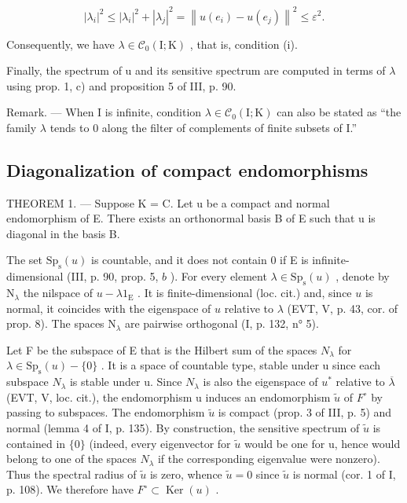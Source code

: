 \[
\left| \lambda_ {i} \right| ^ {2} \leqslant \left| \lambda_ {i} \right| ^ {2} + \left| \lambda_ {j} \right| ^ {2} = \left\| u \left(e _ {i}\right) - u \left(e _ {j}\right) \right\| ^ {2} \leqslant \varepsilon^ {2}.
\]

Consequently, we have \(\lambda \in \mathcal{C}_0(\mathrm{I};\mathrm{K})\) , that is, condition (i).

Finally, the spectrum of u and its sensitive spectrum are computed in terms of \(\lambda\) using prop. 1, c) and proposition 5 of III, p. 90.

Remark. --- When I is infinite, condition \(\lambda\in\mathcal{C}_{0}(\mathrm{I};\mathrm{K})\) can also be stated as “the family \(\lambda\) tends to 0 along the filter of complements of finite subsets of I.”

\subsection{Diagonalization of compact endomorphisms}

THEOREM 1. --- Suppose K = C. Let u be a compact and normal endomorphism of E. There exists an orthonormal basis B of E such that u is diagonal in the basis B.

The set \(\mathrm{Sp}_{\mathrm{s}}(u)\) is countable, and it does not contain 0 if E is infinite-dimensional (III, p. 90, prop. 5, \(b\) ). For every element \(\lambda \in \mathrm{Sp}_{\mathrm{s}}(u)\) , denote by \(\mathrm{N}_{\lambda}\) the nilspace of \(u - \lambda 1_{\mathrm{E}}\) . It is finite-dimensional (loc. cit.) and, since \(u\) is normal, it coincides with the eigenspace of \(u\) relative to \(\lambda\) (EVT, V, p. 43, cor. of prop. 8). The spaces \(\mathrm{N}_{\lambda}\) are pairwise orthogonal (I, p. 132, n° 5).

Let F be the subspace of E that is the Hilbert sum of the spaces \(N_{\lambda}\) for \(\lambda \in \mathrm{Sp}_{\mathrm{s}}(u) - \{0\}\) . It is a space of countable type, stable under u since each subspace \(N_{\lambda}\) is stable under u. Since \(N_{\lambda}\) is also the eigenspace of \(u^{*}\) relative to \(\overline{\lambda}\) (EVT, V, loc. cit.), the endomorphism u induces an endomorphism \(\widetilde{u}\) of \(F^{\circ}\) by passing to subspaces. The endomorphism \(\widetilde{u}\) is compact (prop. 3 of III, p. 5) and normal (lemma 4 of I, p. 135). By construction, the sensitive spectrum of \(\widetilde{u}\) is contained in \(\{0\}\) (indeed, every eigenvector for \(\widetilde{u}\) would be one for u, hence would belong to one of the spaces \(N_{\lambda}\) if the corresponding eigenvalue were nonzero). Thus the spectral radius of \(\widetilde{u}\) is zero, whence \(\widetilde{u}=0\) since \(\widetilde{u}\) is normal (cor. 1 of I, p. 108). We therefore have \(F^{\circ}\subset\operatorname{Ker}(u)\) .

